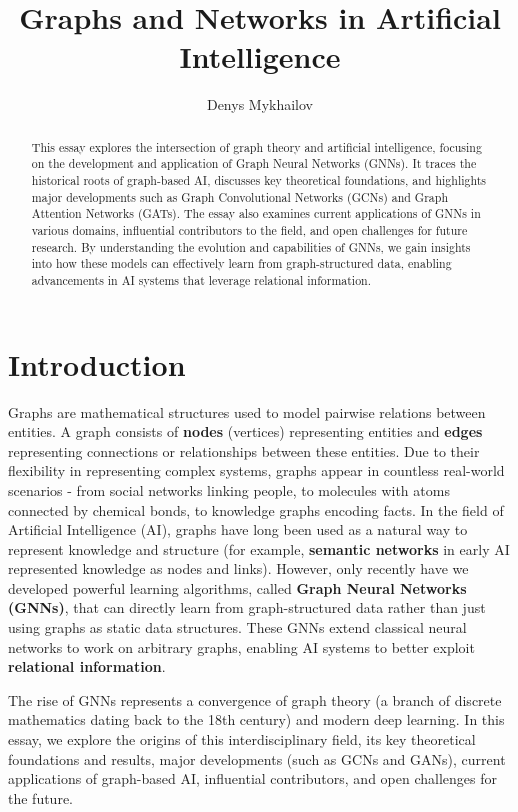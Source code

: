 \documentclass{article}
\title{Graphs and Networks in Artificial Intelligence}
\author{Denys Mykhailov}
\begin{document}
\maketitle

\begin{abstract}

      This essay explores the intersection of graph theory and artificial intelligence, focusing on the development and application of Graph Neural Networks (GNNs).
      It traces the historical roots of graph-based AI, discusses key theoretical foundations, and highlights major developments such as Graph Convolutional Networks (GCNs) and Graph Attention Networks (GATs).
      The essay also examines current applications of GNNs in various domains, influential contributors to the field, and open challenges for future research.
      By understanding the evolution and capabilities of GNNs, we gain insights into how these models can effectively learn from graph-structured data, enabling advancements in AI systems that leverage relational information.

\end{abstract}

\section{Introduction}

Graphs are mathematical structures used to model pairwise relations between entities.
A graph consists of \textbf{nodes} (vertices) representing entities and \textbf{edges} representing connections or relationships between these entities.
Due to their flexibility in representing complex systems, graphs appear in countless real-world scenarios - from social networks linking people, to molecules with atoms connected by chemical bonds, to knowledge graphs encoding facts.
In the field of Artificial Intelligence (AI), graphs have long been used as a natural way to represent knowledge and structure (for example, \textbf{semantic networks} in early AI represented knowledge as nodes and links).
However, only recently have we developed powerful learning algorithms, called \textbf{Graph Neural Networks (GNNs)}, that can directly learn from graph-structured data rather than just using graphs as static data structures.
These GNNs extend classical neural networks to work on arbitrary graphs, enabling AI systems to better exploit \textbf{relational information}.

The rise of GNNs represents a convergence of graph theory (a branch of discrete mathematics dating back to the 18th century) and modern deep learning.
In this essay, we explore the origins of this interdisciplinary field, its key theoretical foundations and results, major developments (such as GCNs and GANs), current applications of graph-based AI, influential contributors, and open challenges for the future.
\end{document}
